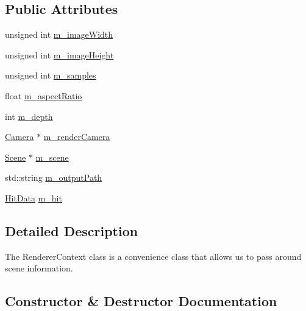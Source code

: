 \subsection*{Public Attributes}
\begin{DoxyCompactItemize}
\item 
unsigned int \hyperlink{structRenderer_1_1RenderContext_a4654e2eb0253d9933aa78ea14b43d3be}{m\+\_\+image\+Width}
\item 
unsigned int \hyperlink{structRenderer_1_1RenderContext_ae9375e1dbdd7f835d4b65527a0cf470b}{m\+\_\+image\+Height}
\item 
unsigned int \hyperlink{structRenderer_1_1RenderContext_abb2007b9ebefdaa2fe0855b19bcc75d5}{m\+\_\+samples}
\item 
float \hyperlink{structRenderer_1_1RenderContext_aa71a4a0454592902c0e59b4d47ff4e83}{m\+\_\+aspect\+Ratio}
\item 
int \hyperlink{structRenderer_1_1RenderContext_ac96c287e23437d653c4fb317ba2a108b}{m\+\_\+depth}
\item 
\hyperlink{classRenderer_1_1Camera}{Camera} $\ast$ \hyperlink{structRenderer_1_1RenderContext_a51c51a98344d7acdef2da9c1f46fd0f8}{m\+\_\+render\+Camera}
\item 
\hyperlink{classRenderer_1_1Scene}{Scene} $\ast$ \hyperlink{structRenderer_1_1RenderContext_adcb12a26eedfa83b6c72d39bbef539b0}{m\+\_\+scene}
\item 
std\+::string \hyperlink{structRenderer_1_1RenderContext_ae317255b06e72c9d98dd65853232a303}{m\+\_\+output\+Path}
\item 
\hyperlink{structRenderer_1_1HitData}{Hit\+Data} \hyperlink{structRenderer_1_1RenderContext_aa9bda306ae7a969d5d2b1af128270edb}{m\+\_\+hit}
\end{DoxyCompactItemize}


\subsection{Detailed Description}
The Renderer\+Context class is a convenience class that allows us to pass around scene information. 

\subsection{Constructor \& Destructor Documentation}
\hypertarget{structRenderer_1_1RenderContext_a7e9f3ac4c9560be1057139836739b6c6}{}
